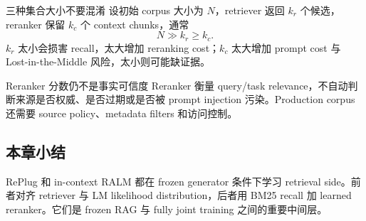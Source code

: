 \begin{importantbox}{三种集合大小不要混淆}
设初始 corpus 大小为 $N$，retriever 返回 $k_r$ 个候选，reranker 保留 $k_c$ 个 context chunks，通常
\[
N\gg k_r\ge k_c.
\]
$k_r$ 太小会损害 recall，太大增加 reranking cost；$k_c$ 太大增加 prompt cost 与 Lost-in-the-Middle 风险，太小则可能缺证据。
\end{importantbox}

\begin{warningbox}{Reranker 分数仍不是事实可信度}
Reranker 衡量 query/task relevance，不自动判断来源是否权威、是否过期或是否被 prompt injection 污染。Production corpus 还需要 source policy、metadata filters 和访问控制。
\end{warningbox}


\subsection{本章小结}

RePlug 和 in-context RALM 都在 frozen generator 条件下学习 retrieval side。前者对齐 retriever 与 LM likelihood distribution，后者用 BM25 recall 加 learned reranker。它们是 frozen RAG 与 fully joint training 之间的重要中间层。

